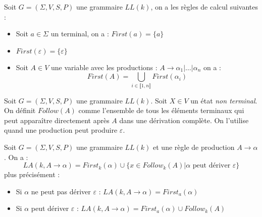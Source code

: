 \begin{prop}
    Soit $G = ( \Sigma, V, S, P)$ une grammaire $LL(k)$, on a les règles de calcul suivantes : 
    \begin{itemize}
        \item Soit $a \in \Sigma$ un terminal, on a : $ First(a) = \{a\}$ 
        \item $First( \varepsilon) = \{ \varepsilon\}$ 
        \item Soit $A \in V$ une variable avec les productions : $A \rightarrow \alpha_1 | \dots | \alpha_n$ on a :
            \[ First(A) = \bigcup_{i \in \llbracket 1, n \rrbracket} First( \alpha_i) \] 
    \end{itemize}
\end{prop}

\begin{definition}
    Soit $G = ( \Sigma, V, S, P)$ une grammaire $LL(k)$. 
    Soit $X \in V$ un état \emph{non terminal}. On définit $Follow(A)$ comme l'ensemble 
    de tous les éléments terminaux qui peut apparaître directement après $A$ dans une dérivation complète. 
    On l'utilise quand une production peut produire $ \varepsilon$. 
\end{definition}

            

\begin{theorem}[Calcul de $LA(k)$]
    Soit $G = ( \Sigma, V, S, P)$ une grammaire $LL(k)$ et une règle de production $A \rightarrow \alpha$.
    On a : 
        \[ \boxed{LA(k, A \rightarrow \alpha) = First_k( \alpha) \cup \{x \in Follow_k(A) | \alpha \text{ peut dériver } \varepsilon\}} \] 
    plus précisément : 
    \begin{itemize}
        \item Si $ \alpha$ ne peut pas dériver $ \varepsilon$ : $LA(k, A \rightarrow \alpha) = First_a( \alpha)$ 
        \item Si $ \alpha$ peut dériver $ \varepsilon$ : $ LA(k, A \rightarrow \alpha) = First_a( \alpha) \cup Follow_k(A) $
    \end{itemize}
\end{theorem}

